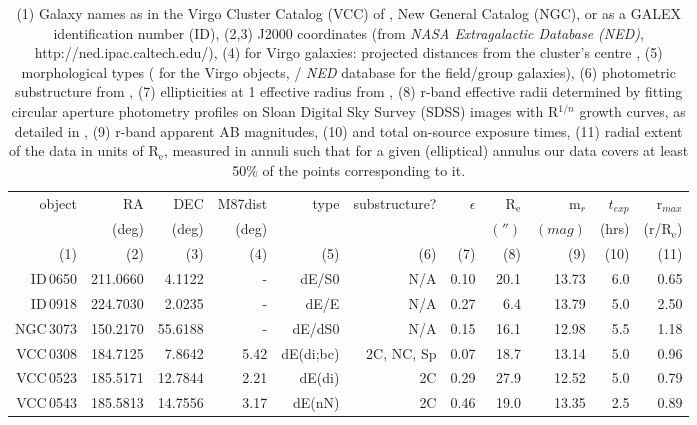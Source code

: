 \documentclass[useAMS,usenatbib]{mn2e}
\newcommand{\re}{$\mathrm{R_e}$}
\begin{document}
\begin{table*}
\caption{(1) Galaxy names as in the Virgo Cluster Catalog (VCC) of \protect\cite{binggeli:1985}, New General Catalog (NGC), or as a GALEX identification number (ID), (2,3) J2000 coordinates (from \textit{NASA Extragalactic Database (NED)}, http://ned.ipac.caltech.edu/), (4) for Virgo galaxies: projected distances from the cluster's centre \protect\citep{lisker:2007}, (5) morphological types (\protect\citealt{lisker:2007} for the Virgo objects, \protect\citealt{michielsen:2008} / \textit{NED} database for the field/group galaxies), (6) photometric substructure from \protect\citealt{janz:2014}, (7) ellipticities at 1 effective radius from \protect\cite{lisker:2007}, (8) r-band effective radii determined by fitting circular aperture photometry profiles on Sloan Digital Sky Survey (SDSS) images with R$^{1/n}$ growth curves, as detailed in \protect\cite{falcon:2011b},  (9) r-band apparent AB magnitudes, (10) and total on-source exposure times, (11) radial extent of the data in units of {\re}, measured in annuli such that for a given (elliptical) annulus our data covers at least 50\% of the points corresponding to it.} 
 \begin{threeparttable}
\centering
\begin{tabular}{|r|r|r|r|r|r|r|r|r|r|r|}
\hline
object    & RA      & DEC    & M87dist & type    	&substructure?&$\epsilon$	&{\re}	& m$_r$ 	& $t_{exp}$& r$_{max}$ \\ 
          & (deg)   & (deg)  & (deg)   &         	&			  & 			&$('')$	&$(mag)$&(hrs)     & (r/{\re})    \\ 
(1)       &(2)      &(3)     &(4)      &(5)       &(6)          &(7)          &(8)        &(9)   			&(10)      & (11)       \\          
\hline
ID\,0650  &211.0660 & 4.1122  & -     &dE/S0    	&N/A		&0.10	&20.1	&13.73	&6.0& 0.65	\\
ID\,0918  &224.7030 & 2.0235  & -     &dE/E     	&N/A		&0.27	& 6.4	&13.79	&5.0& 2.50	\\
NGC\,3073 &150.2170 & 55.6188 & -     &dE/dS0   	&N/A		&0.15	&16.1	&12.98	&5.5& 1.18	\\  
VCC\,0308 &184.7125 & 7.8642  & 5.42  &dE(di;bc)	&2C, NC, Sp	&0.07	&18.7	&13.14	&5.0& 0.96 	\\  
VCC\,0523 &185.5171 & 12.7844 & 2.21  &dE(di)   	&2C			&0.29	&27.9	&12.52	&5.0& 0.79 	\\  
VCC\,0543 &185.5813 & 14.7556 & 3.17  &dE(nN)   	&2C			&0.46	&19.0	&13.35	&2.5& 0.89 	\\

\end{tabular}
\end{threeparttable}
\end{table*}
\end{document}
